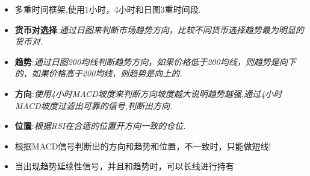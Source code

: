 
%


\begin{itemize}
\item 多重时间框架,使用1小时，4小时和日图3重时间段.
\item \textbf{货币对选择}:\textit{通过日图来判断市场趋势方向，比较不同货币选择趋势最为明显的货币对.}
\item \textbf{趋势}:\textit{通过日图200均线判断趋势方向，如果价格低于200均线，则趋势是向下的，如果价格高于200均线，则趋势是向上的.}
\item \textbf{方向}:\textit{使用4小时MACD坡度来判断方向坡度越大说明趋势越强,通过4小时MACD坡度过滤出可靠的信号,判断出方向.}
\item \textbf{位置}:\textit{根据RSI在合适的位置开方向一致的仓位.}
\item 根据MACD信号判断出的方向和趋势和位置，不一致时，只能做短线!
\item 当出现趋势延续性信号，并且和趋势时，可以长线进行持有

\end{itemize}








